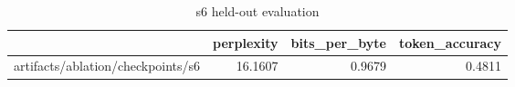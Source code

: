 \begin{table}[t]
\centering
\begin{tabular}{lrrr}
\toprule
 & perplexity & bits\_per\_byte & token\_accuracy \\
\midrule
artifacts/ablation/checkpoints/s6 & 16.1607 & 0.9679 & 0.4811 \\
\bottomrule
\end{tabular}
\caption{s6 held-out evaluation}
\label{tab:s6-eval}
\end{table}
